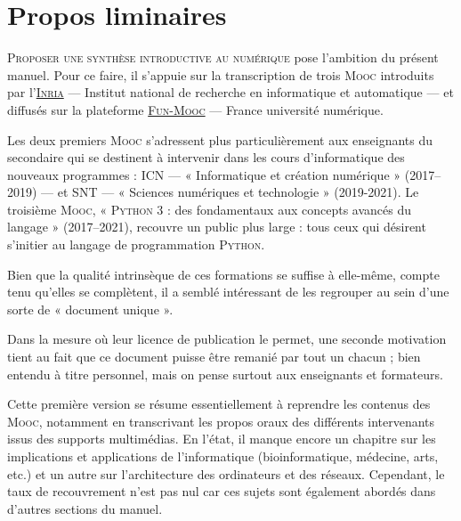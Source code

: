 \chapter*{Propos liminaires}
\label{forewords}



\lettrine{P}{roposer une synthèse introductive au numérique} pose l'ambition du présent manuel. Pour ce faire, il s'appuie sur la transcription de trois \textsc{Mooc} introduits par l'\href{https://www.inria.fr/fr}{\textsc{Inria}} --- Institut national de recherche en informatique et automatique --- et diffusés sur la plateforme \href{https://www.fun-mooc.fr/}{\textsc{Fun-Mooc}} --- France université numérique. 

Les deux premiers \textsc{Mooc} s'adressent plus particulièrement aux enseignants du secondaire qui se destinent à intervenir dans les cours d'informatique des nouveaux programmes : ICN --- « Informatique et création numérique » (2017--2019) --- et SNT --- « Sciences numériques et technologie » (2019-2021). Le troisième \textsc{Mooc}, « \textsc{Python} 3 : des fondamentaux aux concepts avancés du langage » (2017--2021), recouvre un public plus large : tous ceux qui désirent s'initier au langage de programmation \textsc{Python}.

Bien que la qualité intrinsèque de ces formations se suffise à elle-même, compte tenu qu'elles se complètent, il a semblé intéressant de les regrouper au sein d'une sorte de « document unique ».

Dans la mesure où leur licence de publication le permet, une seconde motivation tient au fait que ce document puisse être remanié par tout un chacun ; bien entendu à titre personnel, mais on pense surtout aux enseignants et formateurs.

Cette première version se résume essentiellement à reprendre les contenus des \textsc{Mooc}, notamment en transcrivant les propos oraux des différents intervenants issus des supports multimédias. En l'état, il manque encore un chapitre sur les implications et applications de l'informatique (bioinformatique, médecine, arts, etc.) et un autre sur l'architecture des ordinateurs et des réseaux. Cependant, le taux de recouvrement n'est pas nul car ces sujets sont également abordés dans d'autres sections du manuel. 

